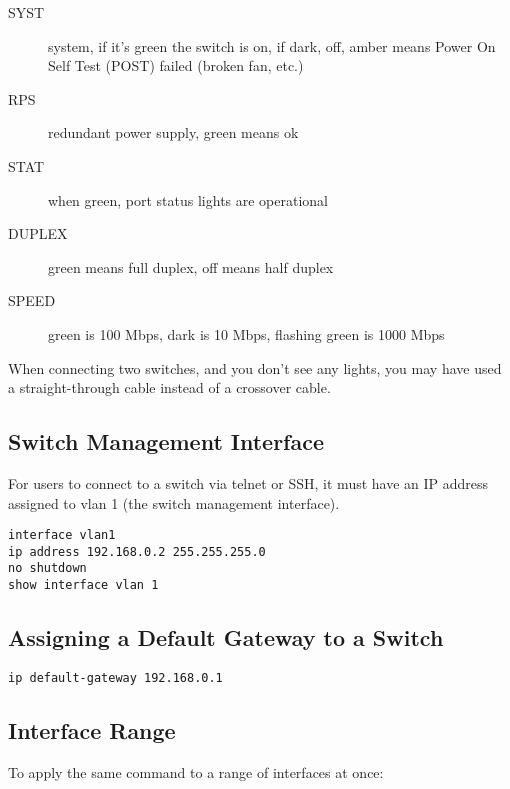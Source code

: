 \begin{description}

\item[SYST]
system, if it's green the switch is on, if dark, off, amber means
Power On Self Test (POST) failed (broken fan, etc.)

\item[RPS]
redundant power supply, green means ok

\item[STAT]
when green, port status lights are operational

\item[DUPLEX]
green means full duplex, off means half duplex

\item[SPEED]
green is 100 Mbps, dark is 10 Mbps, flashing green is 1000 Mbps

\end{description}

When connecting two switches, and you don't see any lights, you may have used
a straight-through cable instead of a crossover cable.\\

\subsection{Switch Management Interface}

For users to connect to a switch via telnet or SSH, it must have an IP address
assigned to vlan 1 (the switch management interface).

\begin{verbatim}
interface vlan1
ip address 192.168.0.2 255.255.255.0
no shutdown
show interface vlan 1
\end{verbatim}

\subsection{Assigning a Default Gateway to a Switch}

\begin{verbatim}
ip default-gateway 192.168.0.1
\end{verbatim}

\subsection{Interface Range}

To apply the same command to a range of interfaces at once:


